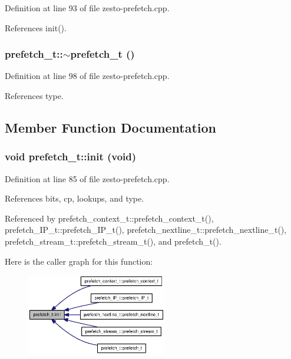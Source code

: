 Definition at line 93 of file zesto-prefetch.cpp.

References init().
\subsubsection[{$\sim$prefetch\_\-t}]{\setlength{\rightskip}{0pt plus 5cm}prefetch\_\-t::$\sim$prefetch\_\-t ()\hspace{0.3cm}{\tt  [virtual]}}\label{classprefetch__t_24ac332db14ad22399215866022e5535}




Definition at line 98 of file zesto-prefetch.cpp.

References type.

\subsection{Member Function Documentation}
\subsubsection[{init}]{\setlength{\rightskip}{0pt plus 5cm}void prefetch\_\-t::init (void)\hspace{0.3cm}{\tt  [protected]}}\label{classprefetch__t_af277c5bf289dbe46e0e66d64aa350ce}




Definition at line 85 of file zesto-prefetch.cpp.

References bits, cp, lookups, and type.

Referenced by prefetch\_\-context\_\-t::prefetch\_\-context\_\-t(), prefetch\_\-IP\_\-t::prefetch\_\-IP\_\-t(), prefetch\_\-nextline\_\-t::prefetch\_\-nextline\_\-t(), prefetch\_\-stream\_\-t::prefetch\_\-stream\_\-t(), and prefetch\_\-t().

Here is the caller graph for this function:\nopagebreak
\begin{figure}[H]
\begin{center}
\leavevmode
\includegraphics[width=173pt]{classprefetch__t_af277c5bf289dbe46e0e66d64aa350ce_icgraph}
\end{center}
\end{figure}
